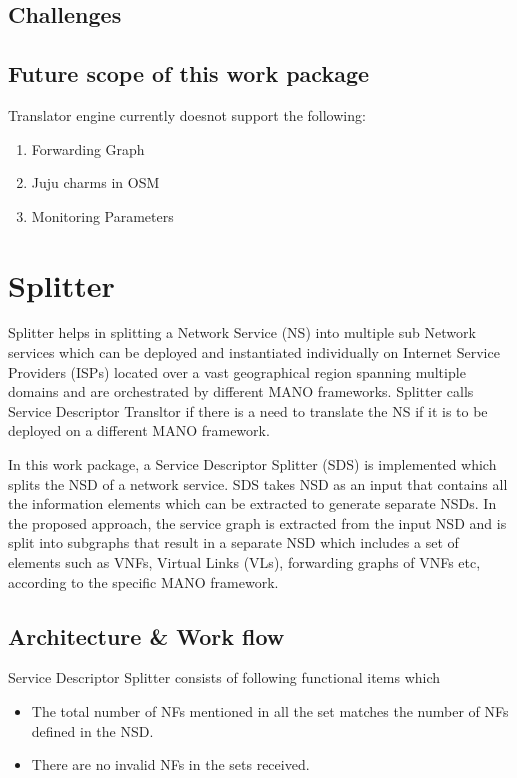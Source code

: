 \subsection{Challenges}

\subsection{Future scope of this work package}

Translator engine currently doesnot support the following:
\begin{enumerate}
	\item Forwarding Graph
	\item Juju charms in OSM
	\item Monitoring Parameters
\end{enumerate}


\newpage

\section{Splitter}
Splitter helps in splitting a Network Service (NS) into multiple sub Network services which can be deployed and instantiated individually on Internet Service Providers (ISPs) located over a vast geographical region spanning multiple domains and are orchestrated by different MANO frameworks. Splitter calls Service Descriptor Transltor if there is a need to translate the NS if it is to be deployed on a different MANO framework.

In this work package, a Service Descriptor Splitter (SDS) is implemented which splits the NSD of a network service. SDS takes
NSD as an input that contains all the information elements which can be extracted to generate separate NSDs. In the proposed approach, the service graph is extracted from the input NSD
and is split into subgraphs that result in a separate NSD which includes a set of elements such as VNFs, Virtual Links (VLs), forwarding graphs of VNFs etc, according to the specific MANO
framework.
\subsection{Architecture \& Work flow}
Service Descriptor Splitter consists of following functional items which 
\begin{itemize}
	\item The total number of NFs mentioned in all the set matches the number of NFs defined in the NSD.
	\item There are no invalid NFs in the sets received.
\end{itemize}

